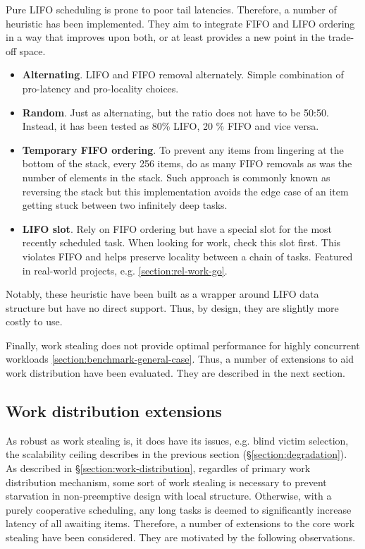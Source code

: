 \documentclass[12pt,a4paper,twoside]{report}
\begin{document}
\label{paragraph:lifo-heuristics}
Pure LIFO scheduling is prone to poor tail latencies. Therefore, a number of heuristic has been implemented. They aim to integrate FIFO and LIFO ordering in a way that improves upon both, or at least provides a new point in the trade-off space.
\begin{itemize}
    \item \textbf{Alternating}. LIFO and FIFO removal alternately. Simple combination of pro-latency and pro-locality choices. 
    \item \textbf{Random}. Just as alternating, but the ratio does not have to be 50:50. Instead, it has been tested as 80\% LIFO, 20 \% FIFO and vice versa.  
    \item \textbf{Temporary FIFO ordering}. To prevent any items from lingering at the bottom of the stack, every 256 items, do as many FIFO removals as was the number of elements in the stack. Such approach is commonly known as reversing the stack but this implementation avoids the edge case of an item getting stuck between two infinitely deep tasks.
    \item \textbf{LIFO slot}. Rely on FIFO ordering but have a special slot for the most recently scheduled task. When looking for work, check this slot first. This violates FIFO and helps preserve locality between a chain of tasks. Featured in real-world projects, e.g. \ref{section:rel-work-go}. 
\end{itemize}
Notably, these heuristic have been built as a wrapper around LIFO data structure but have no direct support. Thus, by design, they are slightly more costly to use. 

Finally, work stealing does not provide optimal performance for highly concurrent workloads \ref{section:benchmark-general-case}. Thus, a number of extensions to aid work distribution have been evaluated. They are described in the next section.

\subsection{Work distribution extensions}
\label{section:work-distribution-extensions}

As robust as work stealing is, it does have its issues, e.g. blind victim selection, the scalability ceiling describes in the previous section (\S\ref{section:degradation}). 
As described in \S\ref{section:work-distribution}, regardles of primary work distribution mechanism, some sort of work stealing is necessary to prevent starvation in non-preemptive design with local structure. Otherwise, with a purely cooperative scheduling, any long tasks is deemed to significantly increase latency of all awaiting items. Therefore, a number of extensions to the core work stealing have been considered. They are motivated by the following observations.
\end{document}

